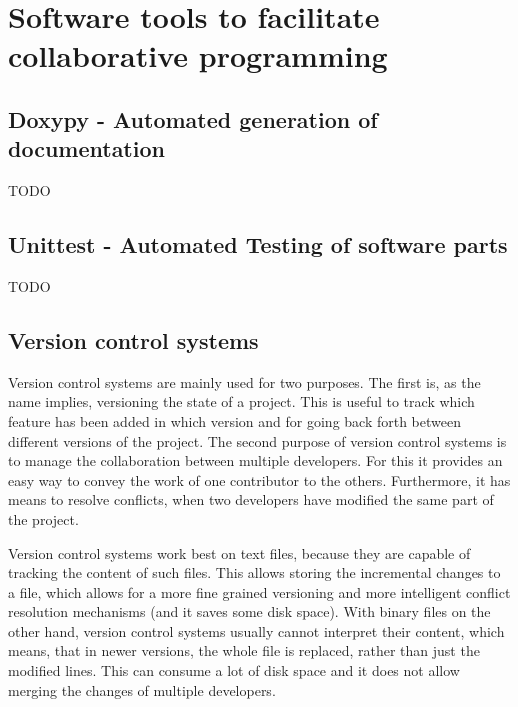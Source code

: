 
\chapter{Software tools to facilitate collaborative programming}

	\section{Doxypy - Automated generation of documentation}
		TODO

	\section{Unittest - Automated Testing of software parts}
		TODO

	\section{Version control systems}
		Version control systems are mainly used for two purposes.
		The first is, as the name implies, versioning the state of a project.
		This is useful to track which feature has been added in which version and for going back forth between different versions of the project.
		The second purpose of version control systems is to manage the collaboration between multiple developers.
		For this it provides an easy way to convey the work of one contributor to the others.
		Furthermore, it has means to resolve conflicts, when two developers have modified the same part of the project.

		Version control systems work best on text files, because they are capable of tracking the content of such files.
		This allows storing the incremental changes to a file, which allows for a more fine grained versioning and more intelligent conflict resolution mechanisms (and it saves some disk space).
		With binary files on the other hand, version control systems usually cannot interpret their content, which means, that in newer versions, the whole file is replaced, rather than just the modified lines.
		This can consume a lot of disk space and it does not allow merging the changes of multiple developers.

